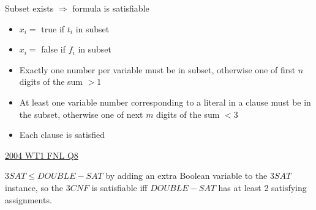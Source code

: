 \documentclass[10pt,landscape,a4paper]{article}
\begin{document}
\begin{multicols*}{3}
Subset exists $\Rightarrow$ formula is satisfiable

\begin{itemize}
    \item $x_i = $ true if $t_i$ in subset
    \item $x_i = $ false if $f_i$ in subset
    \item Exactly one number per variable must be in subset, otherwise one of first $n$ digits of the sum $ > 1$
    \item At least one variable number corresponding to a literal in a clause must be in the subset, otherwise one of next $m$ digits of the sum $< 3$
    \item Each clause is satisfied
\end{itemize}

\underline{2004 WT1 FNL Q8}

$3SAT \leq DOUBLE-SAT$ by adding an extra Boolean variable to the $3SAT$ instance, so the $3CNF$ is satisfiable iff $DOUBLE-SAT$ has at least 2 satisfying assignments.

\end{multicols*}
\end{document}
